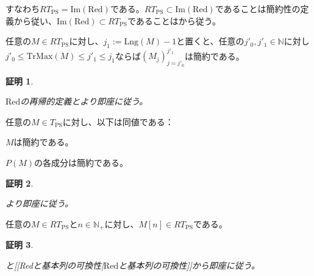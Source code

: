 \documentclass[dvipdfmx,uplatex]{jsarticle}
\theoremstyle{customnonumberbreakfortheorem}
\theoremstyle{customnonumberbreakforproof}
\newtheorem{hideableproof}{証明}
\begin{document}
すなわち\(RT_{\textrm{PS}} = \textrm{Im}(\textrm{Red})\)である。\(RT_{\textrm{PS}} \subset \textrm{Im}(\textrm{Red})\)であることは簡約性の定義から従い、\(\textrm{Im}(\textrm{Red}) \subset RT_{\textrm{PS}}\)であることはから従う。

\begin{proposition}[簡約性の切片への遺伝性]\label{簡約性の切片への遺伝性}
	任意の\(M \in RT_{\textrm{PS}}\)に対し、\(j_1 := \textrm{Lng}(M)-1\)と置くと、任意の\(j'_0,j'_1 \in \mathbb{N}\)に対し\(j'_0 \leq \textrm{TrMax}(M) \leq j'_1 \leq j_1\)ならば\((M_j)_{j=j'_0}^{j'_1}\)は簡約である。
\end{proposition}

\begin{hideableproof}
	\begin{indented}
		\item \(\textrm{Red}\)の再帰的定義とより即座に従う。
	\end{indented}
\end{hideableproof}

\begin{proposition}[\(P\)が簡約性を保つこと]\label{Pが簡約性を保つこと}
	任意の\(M \in T_{\textrm{PS}}\)に対し、以下は同値である：
	\begin{penumerate}
		\item \(M\)は簡約である。
		\item \(P(M)\)の各成分は簡約である。
	\end{penumerate}
\end{proposition}

\begin{hideableproof}
	\begin{indented}
		\item {}より即座に従う。
	\end{indented}
\end{hideableproof}

\begin{proposition}[簡約性が基本列で保たれること]\label{簡約性が基本列で保たれること}
	任意の\(M \in RT_{\textrm{PS}}\)と\(n \in \mathbb{N}_{+}\)に対し、\(M[n] \in RT_{\textrm{PS}}\)である。
\end{proposition}

\begin{hideableproof}
	\begin{indented}
		\item {}と[[Redと基本列の可換性|\(\textrm{Red}\)と基本列の可換性]]から即座に従う。
	\end{indented}
\end{hideableproof}
\end{document}
